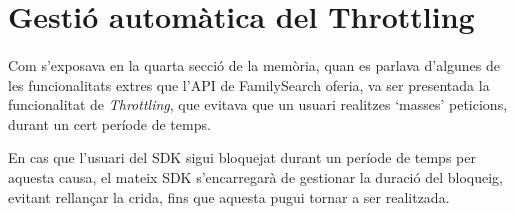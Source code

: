 \section{Gestió automàtica del Throttling}

    \paragraph{}
    Com s'exposava en la quarta secció de la memòria, quan es parlava d'algunes de les funcionalitats extres que l’API de FamilySearch oferia, va ser presentada la funcionalitat de \emph{Throttling}, que evitava que un usuari realitzes `masses' peticions, durant un cert període de temps.

    En cas que l'usuari del SDK sigui bloquejat durant un període de temps per aquesta causa, el mateix SDK s'encarregarà de gestionar la duració del bloqueig, evitant rellançar la crida, fins que aquesta pugui tornar a ser realitzada.
